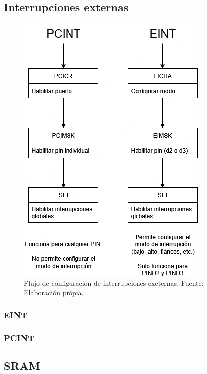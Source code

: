 \subsection{Interrupciones externas}

   \begin{figure}[H]
    \centering
    \includegraphics[width=0.7\linewidth]{./Anexos/Marco Teorico/External Interrupts/Interrupt diagram.png}
    \caption{Flujo de configuración de interrupciones exeternas. Fuente: Elaboración própia.}
    \label{fig:InterruptDiagram}
    \end{figure}


    \subsubsection{EINT}


    \subsubsection{PCINT}

\subsection{SRAM}


